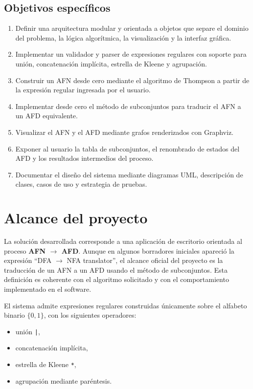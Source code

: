 \documentclass[12pt]{article}
\begin{document}
\subsection{Objetivos específicos}

\begin{enumerate}[label=\arabic*.]
    \item Definir una arquitectura modular y orientada a objetos que separe el dominio del problema, la lógica algorítmica, la visualización y la interfaz gráfica.
    \item Implementar un validador y parser de expresiones regulares con soporte para unión, concatenación implícita, estrella de Kleene y agrupación.
    \item Construir un AFN desde cero mediante el algoritmo de Thompson a partir de la expresión regular ingresada por el usuario.
    \item Implementar desde cero el método de subconjuntos para traducir el AFN a un AFD equivalente.
    \item Visualizar el AFN y el AFD mediante grafos renderizados con Graphviz.
    \item Exponer al usuario la tabla de subconjuntos, el renombrado de estados del AFD y los resultados intermedios del proceso.
    \item Documentar el diseño del sistema mediante diagramas UML, descripción de clases, casos de uso y estrategia de pruebas.
\end{enumerate}

\section{Alcance del proyecto}

La solución desarrollada corresponde a una aplicación de escritorio orientada al proceso \textbf{AFN $\rightarrow$ AFD}. Aunque en algunos borradores iniciales apareció la expresión ``DFA $\rightarrow$ NFA translator'', el alcance oficial del proyecto es la traducción de un AFN a un AFD usando el método de subconjuntos. Esta definición es coherente con el algoritmo solicitado y con el comportamiento implementado en el software.

El sistema admite expresiones regulares construidas únicamente sobre el alfabeto binario $\{0,1\}$, con los siguientes operadores:
\begin{itemize}
    \item unión \texttt{|},
    \item concatenación implícita,
    \item estrella de Kleene \texttt{*},
    \item agrupación mediante paréntesis.
\end{itemize}
\end{document}
